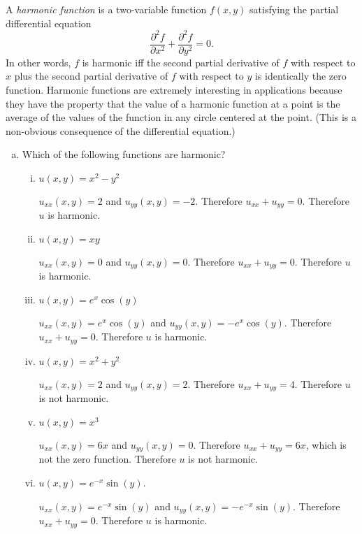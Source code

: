 \begin{problem}
  A \emph{harmonic function} is a two-variable function $f(x,y)$ satisfying the partial differential equation
  \[\frac{\partial^2 f}{\partial x^2}+\frac{\partial^2 f}{\partial y^2}=0.\]
  In other words, $f$ is harmonic iff the second partial derivative of $f$ with respect to $x$ plus the second partial derivative of $f$ with respect to $y$ is identically the zero function. Harmonic functions are extremely interesting in applications because they have the property that the value of a harmonic function at a point is the average of the values of the function in any circle centered at the point. (This is a non-obvious consequence of the differential equation.)
  \begin{enumerate}[(a)]
    \item Which of the following functions are harmonic?
    \begin{enumerate}[(i)]
      \item $u(x,y)=x^2-y^2$
      \begin{solution}
        $u_{xx}(x,y)=2$ and $u_{yy}(x,y)=-2$. Therefore $u_{xx}+u_{yy}=0$. Therefore $u$ is harmonic.
      \end{solution}
      \item $u(x,y)=xy$
      \begin{solution}
        $u_{xx}(x,y)=0$ and $u_{yy}(x,y)=0$. Therefore $u_{xx}+u_{yy}=0$. Therefore $u$ is harmonic.
      \end{solution}
      \item $u(x,y)=e^x\cos(y)$
      \begin{solution}
        $u_{xx}(x,y)=e^x\cos(y)$ and $u_{yy}(x,y)=-e^x\cos(y)$. Therefore $u_{xx}+u_{yy}=0$. Therefore $u$ is harmonic.
      \end{solution}
      \item $u(x,y)=x^2+y^2$
      \begin{solution}
        $u_{xx}(x,y)=2$ and $u_{yy}(x,y)=2$. Therefore $u_{xx}+u_{yy}=4$. Therefore $u$ is not harmonic.
      \end{solution}
      \item $u(x,y)=x^3$
      \begin{solution}
        $u_{xx}(x,y)=6x$ and $u_{yy}(x,y)=0$. Therefore $u_{xx}+u_{yy}=6x$, which is not the zero function. Therefore $u$ is not harmonic.
      \end{solution}
      \item $u(x,y)=e^{-x}\sin(y)$.
      \begin{solution}
        $u_{xx}(x,y)=e^{-x}\sin(y)$ and $u_{yy}(x,y)=-e^{-x}\sin(y)$. Therefore $u_{xx}+u_{yy}=0$. Therefore $u$ is harmonic.
      \end{solution}
    \end{enumerate}


\end{enumerate}
\end{problem}
